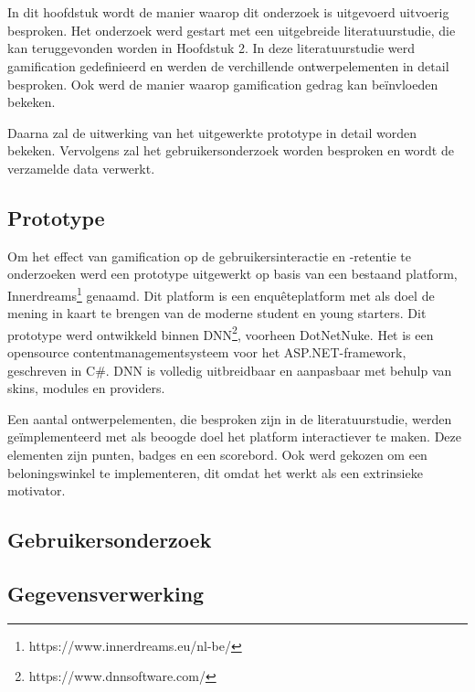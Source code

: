 
\chapter{}
\label{ch:methodologie}


In dit hoofdstuk wordt de manier waarop dit onderzoek is uitgevoerd uitvoerig besproken. Het onderzoek werd gestart met een uitgebreide literatuurstudie, die kan teruggevonden worden in Hoofdstuk 2. In deze literatuurstudie werd gamification gedefinieerd en werden de verchillende ontwerpelementen in detail besproken. Ook werd de manier waarop gamification gedrag kan beïnvloeden bekeken.

Daarna zal de uitwerking van het uitgewerkte prototype in detail worden bekeken. Vervolgens zal het gebruikersonderzoek worden besproken en wordt de verzamelde data verwerkt.

\section{Prototype}

Om het effect van gamification op de gebruikersinteractie en -retentie te onderzoeken werd een prototype uitgewerkt op basis van een bestaand platform, Innerdreams\footnote{https://www.innerdreams.eu/nl-be/} genaamd. Dit platform is een enquêteplatform met als doel de mening in kaart te brengen van de moderne student en young starters. Dit prototype werd ontwikkeld binnen DNN\footnote{https://www.dnnsoftware.com/}, voorheen DotNetNuke. Het is een opensource contentmanagementsysteem voor het ASP.NET-framework, geschreven in C\#. DNN is volledig uitbreidbaar en aanpasbaar met behulp van skins, modules en providers.

Een aantal ontwerpelementen, die besproken zijn in de literatuurstudie, werden geïmplementeerd met als beoogde doel het platform interactiever te maken. Deze elementen zijn punten, badges en een scorebord. Ook werd gekozen om een beloningswinkel te implementeren, dit omdat het werkt als een extrinsieke motivator.

\section{Gebruikersonderzoek}

\section{Gegevensverwerking}

